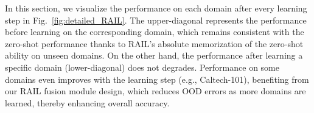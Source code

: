 In this section, we visualize the performance on each domain after every learning step in Fig.~\ref{fig:detailed_RAIL}. The upper-diagonal represents the performance before learning on the corresponding domain, which remains consistent with the zero-shot performance thanks to RAIL's absolute memorization of the zero-shot ability on unseen domains. On the other hand, the performance after learning a specific domain (lower-diagonal) does not degrades. Performance on some domains even improves with the learning step (e.g., Caltech-101), benefiting from our RAIL fusion module design, which reduces OOD errors as more domains are learned, thereby enhancing overall accuracy.


